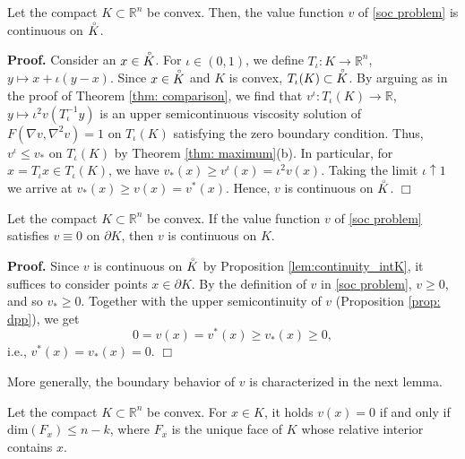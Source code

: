 \documentclass[11pt]{amsart}
\numberwithin{equation}{section}
\newcommand{\rr}{\mathbb{R}}
\newcommand{\ep}{\hfill $\Box$}
\begin{document}
\begin{prop} \label{lem:continuity_intK}
Let the compact $K\subset\mathbb{R}^n$ be convex. Then, the value function $v$ of \eqref{soc problem} is continuous on $\accentset{\circ}{K}$.
\end{prop}

\noindent\textbf{Proof.} Consider an $x\in \accentset{\circ}{K}$. For $\iota\in(0,1)$, we define $T_\iota\!: K\to\rr^n$, $y\mapsto x+\iota(y-x)$. Since $x\in \accentset{\circ}{K}$ and $K$ is convex, $T_\iota(K)\subset\accentset{\circ}{K}$. By arguing as in the proof of Theorem \ref{thm: comparison}, we find that $v^\iota\!:T_\iota(K)\to\rr$, $y\mapsto \iota^2v(T_\iota^{-1}y)$ is an upper semicontinuous viscosity solution of $F(\nabla v,\nabla^2 v)=1$ on $T_\iota(K)$ satisfying the zero boundary condition. Thus, $v^\iota\le v_*$ on $T_\iota(K)$ by Theorem \ref{thm: maximum}(b). In particular, for $x=T_\iota x\in T_\iota(K)$, we have $v_*(x)\ge v^\iota(x)=\iota^2 v(x)$. Taking the limit $\iota\uparrow1$ we arrive at $v_*(x)\ge v(x)=v^*(x)$. Hence, $v$ is continuous on $\accentset{\circ}{K}$. \ep

\begin{prop}
Let the compact $K\subset\mathbb{R}^n$ be convex. If the value function $v$ of \eqref{soc problem} satisfies $v\equiv 0$ on $\partial K$, then $v$ is continuous on $K$.  
\end{prop}

\noindent\textbf{Proof.} Since $v$ is continuous on $\accentset{\circ}{K}$ by Proposition \ref{lem:continuity_intK}, it suffices to consider points $x\in\partial K$. By the definition of $v$ in \eqref{soc problem}, $v\ge0$, and so $v_*\ge0$. Together with the upper semicontinuity of $v$ (Proposition \ref{prop: dpp}), we get 
\begin{equation}\label{0=>cont}
0=v(x)=v^*(x)\ge v_*(x)\ge0, 
\end{equation}
i.e., $v^*(x)=v_*(x)=0$. \ep

\medskip

More generally, the boundary behavior of $v$ is characterized in the next lemma.

\begin{lemma} \label{lem: v=0}
Let the compact $K\subset\mathbb{R}^n$ be convex. For $x\in K$, it holds $v(x) = 0$ if and only if $\text{dim}(F_x)\leq n-k$, where $F_x$ is the unique face of $K$ whose relative interior contains $x$. 
\end{lemma}
\end{document}
